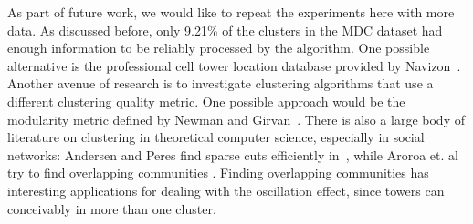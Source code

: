 \documentclass[letterpaper, 12pt, conference]{ieeeconf}
\begin{document}
As part of future work, we would like to repeat the experiments here with 
more data. As discussed before, only 9.21\% of the clusters in the MDC 
dataset had enough information to be reliably processed by the algorithm. One 
possible alternative is the professional cell tower location database 
provided by Navizon~\cite{navizon}. Another avenue of research is to 
investigate clustering algorithms that use a different clustering quality 
metric. One possible approach would be the modularity metric defined by 
Newman and Girvan~\cite{newman}. There is also a large body of literature on 
clustering in theoretical computer science, especially in social networks: 
Andersen and Peres find sparse cuts efficiently in~\cite{sparsecuts}, while 
Aroroa et. al try to find overlapping communities \cite{overlapping}. Finding 
overlapping communities has interesting applications for dealing with the 
oscillation effect, since towers can conceivably in more than one cluster.



\end{document}

